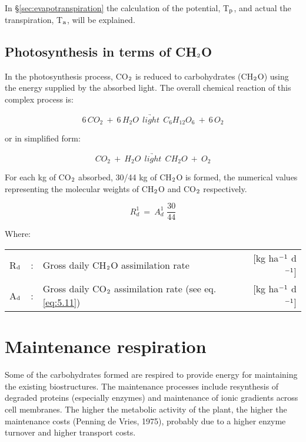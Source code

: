 In \S \ref{sec:evapotranspiration} the calculation of the potential, T$_{{\rm p}}$, and actual 
the transpiration, T$_{{\rm a}}$, will be explained.


\subsection{Photosynthesis in terms of CH$_{{\rm 2}}$O}
In the photosynthesis process, CO$_{{\rm 2}}$ is reduced to carbohydrates (CH$_{{\rm 2}}$O) using the energy supplied by the absorbed light. The overall chemical reaction of this complex process is:

\begin{equation}
6\, CO_{2} ~+~ 6\, H_{2}O ~~ \underrightarrow{light} ~~ C_{6} H_{12} O_{6} ~+~ 6\, O_{2}
\end{equation}

or in simplified form:

\begin{equation}
CO_{2} ~+~ H_{2} O~~ \underrightarrow{light} ~~ CH_{2} O ~+~ O_{2}
\end{equation}

For each kg of CO$_{{\rm 2}}$ absorbed, 30/44 kg of CH$_{{\rm 2}}$O is formed, the numerical values
representing the molecular weights of CH$_{{\rm 2}}$O and CO$_{{\rm 2}}$ respectively.

\begin{equation}
\label{eq:CH2Oassim}
R _{d}^{1} ~=~ A _{d}^{1} \,\,{\frac{30}{44}}
\end{equation}

Where:\\[5pt]
\begin{tabularx}{\textwidth}{llXr}
	R$_{{\rm d}}$ &:& Gross daily CH$_{{\rm 2}}$O assimilation rate 
	 &   [kg ha$^{{\rm -1}}$ d$^{{\rm -1}}$]\\
	A$_{{\rm d}}$ &:& Gross daily CO$_{{\rm 2}}$ assimilation rate 
	(see eq. \ref{eq:5.11})  &    [kg ha$^{{\rm -1}}$ d$^{{\rm -1}}$]\\   
\end{tabularx}


\section{Maintenance respiration}

Some of the carbohydrates formed are respired to provide energy for maintaining the
existing biostructures. The maintenance processes include resynthesis of degraded proteins
(especially enzymes) and maintenance of ionic gradients across cell membranes. The
higher the metabolic activity of the plant, the higher the maintenance costs (Penning de
Vries, 1975), probably due to a higher enzyme turnover and higher transport costs.

